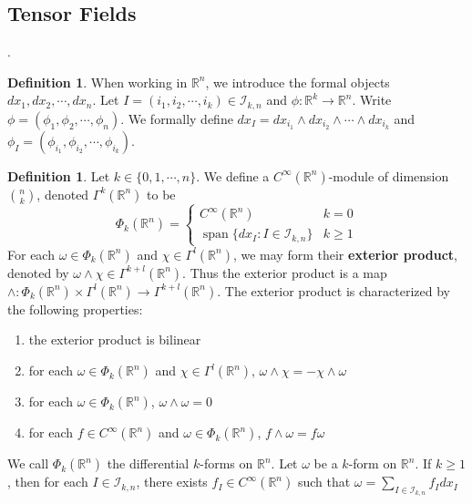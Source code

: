 \documentclass[12pt]{amsart}
\theoremstyle{definition}
\newtheorem{defn}[definition]{Definition}
\theoremstyle{remark}
\theoremstyle{definition}
\newcommand{\om}{\omega}
\newcommand{\R}{\mathbb{R}}
\newcommand{\MI}{\mathcal{I}}
\DeclareMathOperator{\spn}{span}
\begin{document}
	
	
	
	
	
	
	
	
	
	
	
	
	
	
	
	
	
	
	\newpage
	\subsection{Tensor Fields}
	
	
	
	
	
	
	
	
	\newpage.
	\newpage 
	\begin{defn}
		When working in $\R^n$, we introduce the formal objects $dx_1, dx_2, \cdots, dx_n$. Let $I = (i_1, i_2, \cdots, i_k)\in \MI_{k,n}$ and $\phi: \R^k \rightarrow \R^n$. Write $\phi = (\phi_1, \phi_2, \cdots, \phi_n)$. We formally define $dx_I = dx_{i_1}\wedge dx_{i_2} \wedge \cdots \wedge dx_{i_k}$ and $\phi_I = (\phi_{i_1}, \phi_{i_2}, \cdots, \phi_{i_k})$.   
	\end{defn}
	
	\begin{defn}
		Let $k \in \{0, 1, \cdots, n\}$. We define a $C^{\infty}(\R^n)$-module of dimension ${n \choose k}$, denoted $\Gamma^k(\R^n)$ to be 
		\[
		\Phi_k(\R^n) =
		\begin{cases}
			C^{\infty}(\R^n) & k = 0 \\
			\spn \{ dx_I: I \in \MI_{k,n} \} & k \geq 1
		\end{cases}
		\]
		For each $\om \in \Phi_k(\R^n)$ and $\chi \in \Gamma^l(\R^n)$,   we may form their \textbf{exterior product}, denoted by $\om \wedge \chi \in \Gamma^{k+l}(\R^n)$. Thus the exterior product is a map $\wedge : \Phi_k(\R^n) \times \Gamma^l(\R^n)\rightarrow \Gamma^{k+l}(\R^n)$. The exterior product is characterized by the following properties:
		\begin{enumerate}
			\item the exterior product is bilinear
			\item for each $\om \in \Phi_k(\R^n)$ and $\chi \in \Gamma^l(\R^n)$, $\om \wedge \chi = - \chi \wedge \om$ 
			\item for each $\om \in \Phi_k(\R^n)$, $\om \wedge \om = 0$
			\item for each $f \in C^{\infty}(\R^n)$ and $ \om \in \Phi_k(\R^n)$, $f \wedge \om = f \om$
		\end{enumerate}
		We call $\Phi_k(\R^n)$ the differential $k$-forms on $\R^n$. Let $\om$ be a $k$-form on $\R^n$. If $k \geq 1$, then for each $I \in \MI_{k,n}$, there exists $f_I \in C^{\infty}(\R^n)$ such that $\om = \sum\limits_{I \in \MI_{k,n}} f_I dx_I$
	\end{defn}
	
\end{document}
